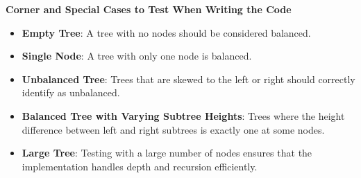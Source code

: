 \textbf{Corner and Special Cases to Test When Writing the Code}

\begin{itemize}
    \item \textbf{Empty Tree}: A tree with no nodes should be considered balanced.
    \item \textbf{Single Node}: A tree with only one node is balanced.
    \item \textbf{Unbalanced Tree}: Trees that are skewed to the left or right should correctly identify as unbalanced.
    \item \textbf{Balanced Tree with Varying Subtree Heights}: Trees where the height difference between left and right subtrees is exactly one at some nodes.
    \item \textbf{Large Tree}: Testing with a large number of nodes ensures that the implementation handles depth and recursion efficiently.
\end{itemize}